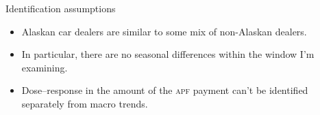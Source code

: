 \documentclass[aspectratio=169]{beamer}
\begin{document}
\begin{frame}{Identification assumptions}
	\begin{itemize}
		\item Alaskan car dealers are similar to some mix of non-Alaskan dealers.
		\item In particular, there are no seasonal differences within the window I'm examining.
		\item Dose--response in the amount of the \textsc{apf} payment can't be identified separately from macro trends.
	\end{itemize}
\end{frame}
\end{document}
